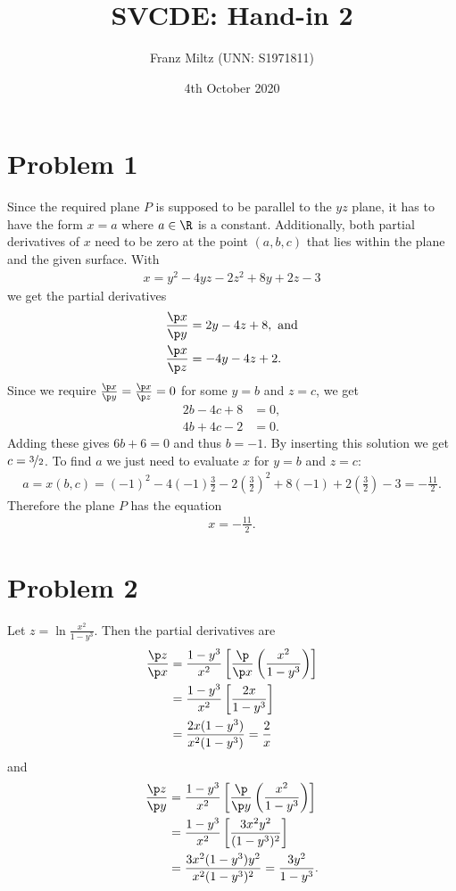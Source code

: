\documentclass{article}
\begin{document}
\title{SVCDE: Hand-in 2}
\author{Franz Miltz (UNN: S1971811)}
\date{4th October 2020}
\maketitle
\section*{Problem 1}
Since the required plane $P$ is supposed to be parallel to the $yz$ plane, it
has to have the form $x=a$ where $a\in\R$ is a constant.
Additionally, both partial derivatives of $x$ need to be zero at the
point $(a,b,c)$ that lies within the plane and the given surface.
With
\begin{align*}
  x = y^2 - 4yz - 2z^2 + 8y + 2z -3
\end{align*}
we get the partial derivatives
\begin{align*}
  \frac{\p x}{\p y}&=2y - 4z + 8,\text{ and}\\
  \frac{\p x}{\p z}&=-4y-4z+2.
\end{align*}
Since we require $\frac{\p x}{\p y}=\frac{\p x}{\p z}=0$ for
some $y=b$ and $z=c$, we get
\begin{align*}
  2b - 4c + 8 &= 0,\\
  4b + 4c - 2 &= 0.
\end{align*}
Adding these gives $6b + 6 = 0$ and thus $b=-1$.
By inserting this solution we get $c=\nicefrac{3}{2}$. 
To find $a$ we just need to evaluate $x$ for $y=b$ and $z=c$:
\begin{align*}
  a = x(b,c) = (-1)^2 - 4(-1)\frac{3}{2} - 2\left(\frac{3}{2}\right)^2
      + 8(-1) + 2\left(\frac{3}{2}\right) - 3 = - \frac{11}{2}. 
\end{align*}
Therefore the plane $P$ has the equation
\begin{align*}
  x = -\frac{11}{2}.
\end{align*}
\section*{Problem 2}
Let $ z = \ln\frac{x^2}{1-y^3}$. Then the partial derivatives are
\begin{align*}
  \frac{\p z}{\p x}
  &=\frac{1-y^3}{x^2}\left[\frac{\p}{\p x}\left(\frac{x^2}{1-y^3}\right)\right]\\
  &=\frac{1-y^3}{x^2}\left[\frac{2x}{1-y^3}\right]\\
  &=\frac{2x(1-y^3)}{x^2(1-y^3)}=\frac{2}{x}
\end{align*}
and
\begin{align*}
  \frac{\p z}{\p y}
  &=\frac{1-y^3}{x^2}\left[\frac{\p}{\p y}\left( \frac{x^2}{1-y^3}\right)\right]\\
  &=\frac{1-y^3}{x^2}\left[\frac{3x^2y^2}{(1-y^3)^2}\right]\\
  &=\frac{3x^2(1-y^3)y^2}{x^2(1-y^3)^2} =\frac{3y^2}{1-y^3}.
\end{align*}
\end{document}

